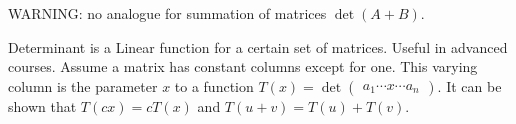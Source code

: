 \begin{card}
    WARNING: no analogue for summation of matrices $\det (A + B)$.

    \begin{compactdesc}
    \item[Determinant is a Linear] function for a certain set of matrices.
        Useful in advanced courses. Assume a matrix has constant columns
        except for one. This varying column is the parameter $x$ to
        a function $T(x) = \det \begin{pmatrix} a_1 \cdots x \cdots a_n \end{pmatrix}$.
        It can be shown that $T(cx) = cT(x)$ and $T(u + v) = T(u) + T(v)$.
    \end{compactdesc}
\end{card}


